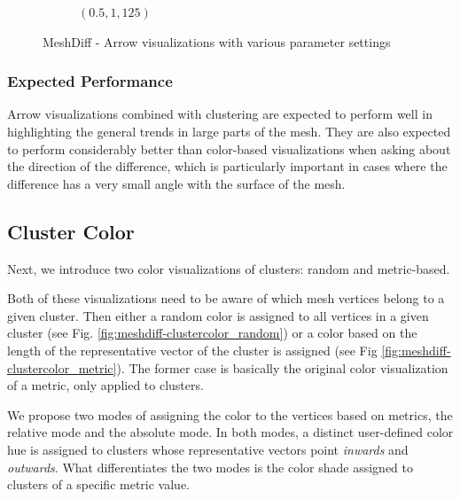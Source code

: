 \begin{figure}[h]
\begin{subfigure}{0.4\textwidth}
    \caption{\((0.5,1,125)\)}
    \label{fig:meshdiff-arrows_1-125}
	\end{subfigure}
\caption[MeshDiff - Arrow visualizations with various parameter settings]{MeshDiff - Arrow visualizations with various parameter settings\footnotemark}
\label{fig:meshdiff-arrows}
\end{figure}


\subsubsection{Expected Performance}

Arrow visualizations combined with clustering are expected to perform well in highlighting the general trends in large parts of the mesh. They are also expected to perform considerably better than color-based visualizations when asking about the direction of the difference, which is particularly important in cases where the difference has a very small angle with the surface of the mesh.
\subsection{Cluster Color}
\label{subsec:analysis-visualizations-cluster_color}

Next, we introduce two color visualizations of clusters: random and metric-based.

Both of these visualizations need to be aware of which mesh vertices belong to a given cluster. Then either a random color is assigned to all vertices in a given cluster (see Fig. \ref{fig:meshdiff-clustercolor_random}) or a color based on the length of the representative vector of the cluster is assigned (see Fig \ref{fig:meshdiff-clustercolor_metric}). The former case is basically the original color visualization of a metric, only applied to clusters.

We propose two modes of assigning the color to the vertices based on metrics, the relative mode and the absolute mode. In both modes, a distinct user-defined color hue is assigned to clusters whose representative vectors point {\it inwards} and {\it outwards}. What differentiates the two modes is the color shade assigned to clusters of a specific metric value.

